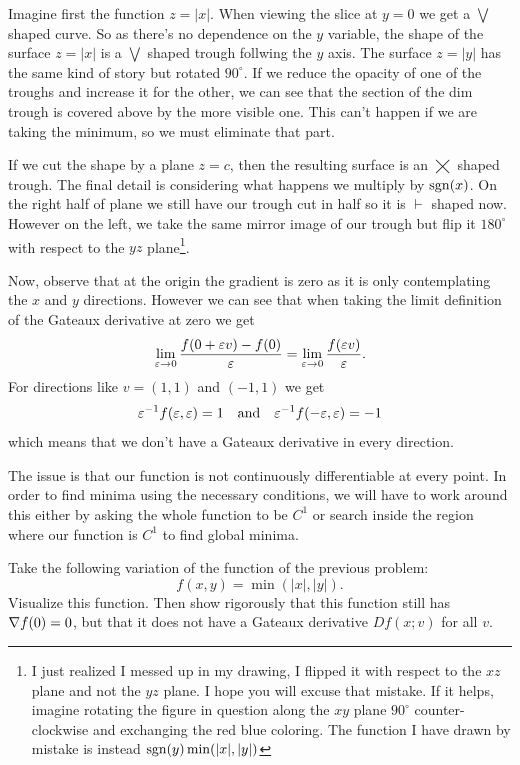 \documentclass[12pt]{memoir}
\begin{document}
\begin{ptcbr}
    Imagine first the function $z=|x|$. When viewing the slice at $y=0$ we get a $\bigvee$ shaped curve. So as there's no dependence on the $y$ variable, the shape of the surface $z=|x|$ is a $\bigvee$ shaped trough follwing the $y$ axis. The surface $z=|y|$ has the same kind of story but rotated $90^\circ$. If we reduce the opacity of one of the troughs and increase it for the other, we can see that the section of the dim trough is covered above by the more visible one. This can't happen if we are taking the minimum, so we must eliminate that part.\par 
    If we cut the shape by a plane $z=c$, then the resulting surface is an $\bigtimes$ shaped trough. The final detail is considering what happens we multiply by $\operatorname{sgn}(x)$. On the right half of plane we still have our trough cut in half so it is $\vdash$ shaped now. However on the left, we take the same mirror image of our trough but flip it $180^\circ$ with respect to the $yz$ plane\footnote{I just realized I messed up in my drawing, I flipped it with respect to the $xz$ plane and not the $yz$ plane. I hope you will excuse that mistake. If it helps, imagine rotating the figure in question along the $xy$ plane $90^\circ$ counter-clockwise and exchanging the red blue coloring. The function I have drawn by mistake is instead $\operatorname{sgn}(y)\min(|x|,|y|)$}.\par 
    Now, observe that at the origin the gradient is zero as it is only contemplating the $x$ and $y$ directions. However we can see that when taking the limit definition of the Gateaux derivative at zero we get
    $$\lim_{\varepsilon\to 0}\frac{f(0+\varepsilon v)-f(0)}{\varepsilon}=\lim_{\varepsilon\to0}\frac{f(\varepsilon v)}{\varepsilon}.$$
    For directions like $v=(1,1)$ and $(-1,1)$ we get 
    $$\varepsilon^{-1}f(\varepsilon,\varepsilon)=1\quad\text{and}\quad\varepsilon^{-1}f(-\varepsilon,\varepsilon)=-1$$
    which means that we don't have a Gateaux derivative in every direction.\par 
    The issue is that our function is not continuously differentiable at every point. In order to find minima using the necessary conditions, we will have to work around this either by asking the whole function to be $C^1$ or search inside the region where our function is $C^1$ to find global minima. 
\end{ptcbr}

\begin{Ej}
    Take the following variation of the function of the previous
problem:
$$f(x,y)=\min(|x|,|y|).$$
Visualize this function. Then show rigorously that this function still has $\nabla f(0)=0$, but that it does not
have a Gateaux derivative $Df(x;v)$ for all $v$.
\end{Ej}
\end{document}
